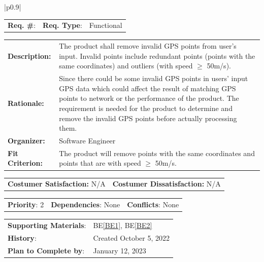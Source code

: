 \documentclass[12pt, titlepage]{article}
\newcommand{\beref}[1]{BE\ref{#1}}
\newcounter{reqnum}
\newcommand{\reqthereqnum}{\textbf{Req. \#}: \thereqnum}
\newenvironment{boxed}
    {\begin{center}
    \begin{tabular}{|p{0.9\textwidth}|}
    \hline\\
    }
    { 
    \\\\\hline
    \end{tabular} 
    \end{center}
    }
\begin{document}
\begin{boxed}
\begin{tabular}{l r r}
{reqnum} \reqthereqnum \label{Req2} & {\bf Req. Type}: &  Functional\\
\end{tabular}
\newline
\begin{tabular}{l p{11.5cm}}
    {\bf Description:} & The product shall remove invalid GPS points from user's input. Invalid points include redundant points (points with the same coordinates) and outliers (with speed $\ge$ 50m/s).  \\
    {\bf Rationale:} & Since there could be some invalid GPS points in users' input GPS data which could affect the result of matching GPS points to network or the performance of the product. The requirement is needed for the product to determine and remove the invalid GPS points before actually processing them.\\
    {\bf Organizer:} & Software Engineer\\
    {\bf Fit Criterion:} & The product will remove points with the same coordinates and points that are with speed $\ge$ 50m/s. \\
\end{tabular}
\begin{tabular}{l r}
{\bf Costumer Satisfaction:} N/A &  {\bf Costumer Dissatisfaction:}  N/A\\
\end{tabular}
\begin{tabular}{l r r}
    {\bf Priority}: 2 & {\bf Dependencies}: None  & {\bf Conflicts}: None \\
\end{tabular}
\begin{tabular}{l l}
     {\bf Supporting Materials}:& 
     \beref{BE1}, \beref{BE2} \\ 
     {\bf History}: & Created October 5, 2022\\
     {\bf Plan to Complete by}: & January 12, 2023\\
\end{tabular}
\end{boxed}
\end{document}
